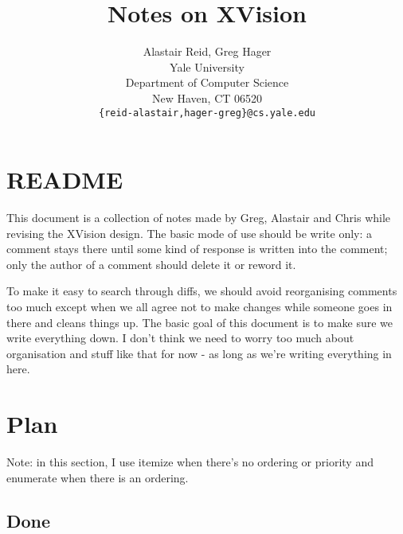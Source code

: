 




\title{%
  Notes on XVision%
}

\author{Alastair Reid, Greg Hager\\
Yale University\\
Department of Computer Science\\
New Haven, CT 06520\\
{\tt \{reid-alastair,hager-greg\}@cs.yale.edu}}


\maketitle


\section{README}

This document is a collection of notes made by Greg, Alastair and
Chris while revising the XVision design.  The basic mode of use should
be write only: a comment stays there until some kind of response is
written into the comment; only the author of a comment should delete
it or reword it.  

To make it easy to search through diffs, we should avoid reorganising
comments too much except when we all agree not to make changes while
someone goes in there and cleans things up.  The basic goal of this
document is to make sure we write everything down.  I don't think we
need to worry too much about organisation and stuff like that for now
- as long as we're writing everything in here.


\section{Plan}

Note: in this section, I use itemize when there's no ordering
or priority and enumerate when there is an ordering.

\subsection{Done}

